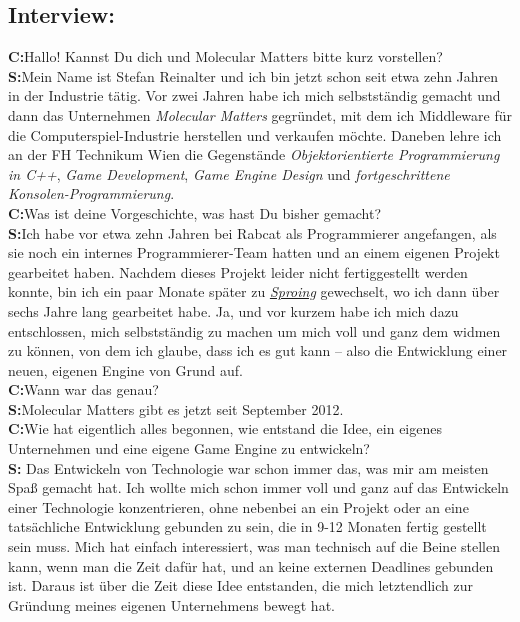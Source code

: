\subsection*{Interview:}
\textbf{C:}Hallo! Kannst Du dich und Molecular Matters bitte kurz vorstellen? \\
\textbf{S:}Mein Name ist Stefan Reinalter und ich bin jetzt schon seit etwa zehn Jahren in der Industrie tätig. Vor zwei Jahren habe ich mich selbstständig gemacht und dann das Unternehmen \textit{Molecular Matters} gegründet, mit dem ich Middleware für die Computerspiel-Industrie herstellen und verkaufen möchte. Daneben lehre ich an der FH Technikum Wien die Gegenstände \textit{Objektorientierte Programmierung in C++},  \textit{Game Development}, \textit{Game Engine Design} und \textit{fortgeschrittene Konsolen-Programmierung}. \\
\textbf{C:}Was ist deine Vorgeschichte, was hast Du bisher gemacht? \\
\textbf{S:}Ich habe vor etwa zehn Jahren bei Rabcat als Programmierer angefangen, als sie noch ein internes Programmierer-Team hatten und an einem eigenen Projekt gearbeitet haben. Nachdem dieses Projekt leider nicht fertiggestellt werden konnte, bin ich ein paar Monate später zu \href{http://www.sproing.com}{\textit{Sproing}} gewechselt, wo ich dann über sechs Jahre lang gearbeitet habe. Ja, und vor kurzem habe ich mich dazu entschlossen, mich selbstständig zu machen um mich voll und ganz dem widmen zu können, von dem ich glaube, dass ich es gut kann – also die Entwicklung einer neuen, eigenen Engine von Grund auf. \\
\textbf{C:}Wann war das genau? \\
\textbf{S:}Molecular Matters gibt es jetzt seit September 2012. \\
\textbf{C:}Wie hat eigentlich alles begonnen, wie entstand die Idee, ein eigenes Unternehmen und eine eigene Game Engine zu entwickeln? \\
\textbf{S:} Das Entwickeln von Technologie war schon immer das, was mir am meisten Spaß gemacht hat. Ich wollte mich schon immer voll und ganz auf das Entwickeln einer Technologie konzentrieren, ohne nebenbei an ein Projekt oder an eine tatsächliche Entwicklung gebunden zu sein, die in 9-12 Monaten fertig gestellt sein muss. Mich hat einfach interessiert, was man technisch auf die Beine stellen kann, wenn man die Zeit dafür hat, und an keine externen Deadlines gebunden ist. Daraus ist über die Zeit diese Idee entstanden, die mich letztendlich zur Gründung meines eigenen Unternehmens bewegt hat. \\

